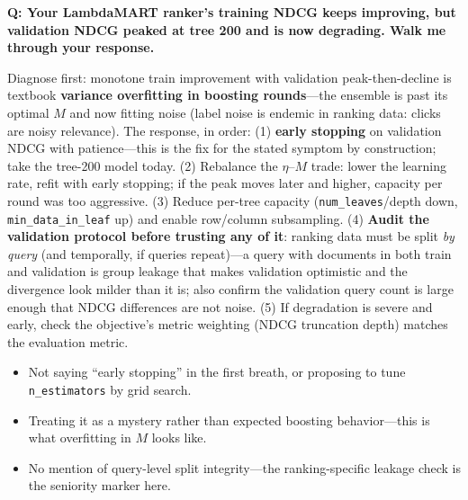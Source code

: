 \begin{interviewq}
\end{interviewq}

\begin{interviewq}
\textbf{Q: Your LambdaMART ranker's training NDCG keeps improving, but validation NDCG peaked at tree 200 and is now degrading. Walk me through your response.}

 \quad {} \quad \badgefreq{\freqmed}

\stronganswer

Diagnose first: monotone train improvement with validation peak-then-decline is textbook \textbf{variance overfitting in boosting rounds}---the ensemble is past its optimal $M$ and now fitting noise (label noise is endemic in ranking data: clicks are noisy relevance). The response, in order: (1) \textbf{early stopping} on validation NDCG with patience---this is the fix for the stated symptom by construction; take the tree-200 model today. (2) Rebalance the $\eta$--$M$ trade: lower the learning rate, refit with early stopping; if the peak moves later and higher, capacity per round was too aggressive. (3) Reduce per-tree capacity (\texttt{num\_leaves}/depth down, \texttt{min\_data\_in\_leaf} up) and enable row/column subsampling. (4) \textbf{Audit the validation protocol before trusting any of it}: ranking data must be split \textit{by query} (and temporally, if queries repeat)---a query with documents in both train and validation is group leakage that makes validation optimistic and the divergence look milder than it is; also confirm the validation query count is large enough that NDCG differences are not noise. (5) If degradation is severe and early, check the objective's metric weighting (NDCG truncation depth) matches the evaluation metric.

\redflags
\begin{itemize}
    \item Not saying ``early stopping'' in the first breath, or proposing to tune \texttt{n\_estimators} by grid search.
    \item Treating it as a mystery rather than expected boosting behavior---this is what overfitting in $M$ looks like.
    \item No mention of query-level split integrity---the ranking-specific leakage check is the seniority marker here.
\end{itemize}


\end{interviewq}
